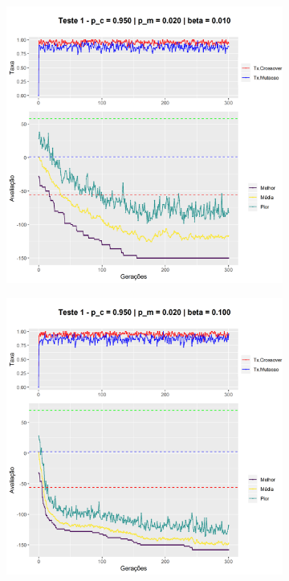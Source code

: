 \begin{figure}[h!]
	\centering
	\begin{subfigure}[b]{0.47\linewidth}
		\includegraphics[width=\linewidth]{imagens/graph_pc_0_950_pm_0_020_pop_50_g_300__1_beta_0_01.png}
		\caption{}
	\end{subfigure}
	\begin{subfigure}[b]{0.47\linewidth}
		\includegraphics[width=\linewidth]{imagens/graph_pc_0_950_pm_0_020_pop_50_g_300__1_beta_0_1.png}

\end{subfigure}
\end{figure}
